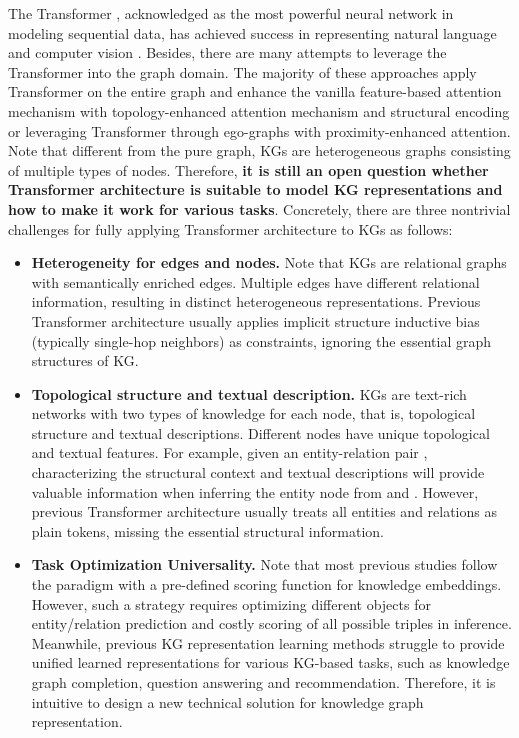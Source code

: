 \documentclass[sigconf]{acmart}
\begin{document}
The Transformer \cite{transformers}, acknowledged as the most powerful neural network in modeling sequential data, has achieved success in representing natural language \cite{BERT} and computer vision \cite{DBLP:conf/iclr/DosovitskiyB0WZ21}. 
Besides, there are many attempts to leverage the Transformer into the graph domain. 
The majority of these approaches \cite{Graphormer,Gophormer} apply Transformer on the entire graph and enhance the vanilla feature-based attention mechanism with topology-enhanced attention mechanism and structural encoding or leveraging Transformer through ego-graphs with proximity-enhanced attention. 
Note that different from the pure graph, KGs are heterogeneous graphs consisting of multiple types of nodes.
Therefore, \textbf{it is still an open question whether Transformer architecture is suitable to model KG representations and how to make it work for various tasks}.
Concretely, there are three nontrivial challenges for fully applying Transformer architecture to KGs as follows:
\begin{itemize}
\item  \textbf{Heterogeneity for edges and nodes.}
Note that  KGs are relational graphs with semantically enriched edges. 
Multiple edges have different relational information, resulting in distinct heterogeneous representations. 
Previous Transformer architecture usually applies implicit structure inductive bias (typically single-hop neighbors) as constraints, ignoring the essential graph structures of KG.

\item  \textbf{Topological structure and textual description.}
KGs are text-rich networks with two types of knowledge for each node, that is, topological structure and textual descriptions.
Different nodes have unique topological and textual features.
For example, given an entity-relation pair , characterizing the structural context and textual descriptions will provide valuable information when inferring the entity node from  and .
However, previous Transformer architecture usually treats all entities and relations as plain tokens, missing the essential structural information.


\item  \textbf{Task Optimization Universality.} 
Note that most previous studies \cite{TransE} follow the paradigm with a pre-defined scoring function for knowledge embeddings. 
However, such a strategy requires optimizing different objects for entity/relation prediction and costly scoring of all possible triples in inference. 
Meanwhile, previous KG representation learning methods struggle to provide unified learned representations for various KG-based tasks, such as knowledge graph completion, question answering and recommendation.
Therefore, it is intuitive to design a new technical solution for knowledge graph representation.

\end{itemize}
\end{document}
